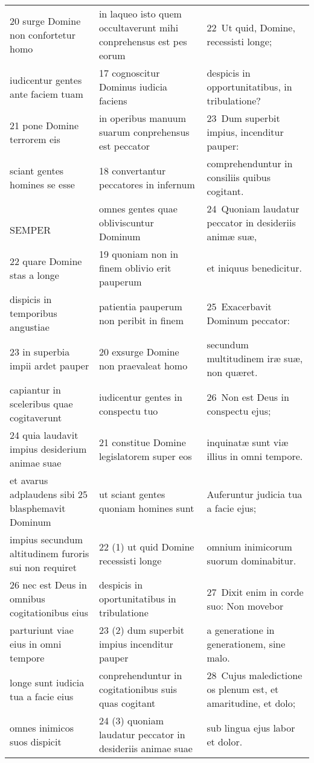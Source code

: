\documentclass{article}
\begin{document}
\begin{longtable}{@{}p{}p{}p{}@{}}
20 surge Domine non confortetur homo	&	in laqueo isto quem occultaverunt mihi conprehensus est pes eorum	&	22 Ut quid, Domine, recessisti longe;	\\
iudicentur gentes ante faciem tuam	&	17 cognoscitur Dominus iudicia faciens	&	despicis in opportunitatibus, in tribulatione?	\\
21 pone Domine terrorem eis	&	in operibus manuum suarum conprehensus est peccator	&	23 Dum superbit impius, incenditur pauper:	\\
sciant gentes homines se esse	&	18 convertantur peccatores in infernum	&	comprehenduntur in consiliis quibus cogitant.	\\
    SEMPER	&	omnes gentes quae obliviscuntur Dominum	&	24 Quoniam laudatur peccator in desideriis animæ suæ,	\\
22 quare Domine stas a longe	&	19 quoniam non in finem oblivio erit pauperum	&	et iniquus benedicitur.	\\
dispicis in temporibus angustiae	&	patientia pauperum non peribit in finem	&	25 Exacerbavit Dominum peccator:	\\
23 in superbia impii ardet pauper	&	20 exsurge Domine non praevaleat homo	&	secundum multitudinem iræ suæ, non quæret.	\\
capiantur in sceleribus quae cogitaverunt	&	iudicentur gentes in conspectu tuo	&	26 Non est Deus in conspectu ejus;	\\
24 quia laudavit impius desiderium animae suae	&	21 constitue Domine legislatorem super eos	&	inquinatæ sunt viæ illius in omni tempore.	\\
et avarus adplaudens sibi 25 blasphemavit Dominum	&	ut sciant gentes quoniam homines sunt	&	Auferuntur judicia tua a facie ejus;	\\
impius secundum altitudinem furoris sui non requiret	&	22 (1) ut quid Domine recessisti longe	&	omnium inimicorum suorum dominabitur.	\\
26 nec est Deus in omnibus cogitationibus eius	&	despicis in oportunitatibus in tribulatione	&	27 Dixit enim in corde suo: Non movebor	\\
parturiunt viae eius in omni tempore	&	23 (2) dum superbit impius incenditur pauper	&	a generatione in generationem, sine malo.	\\
longe sunt iudicia tua a facie eius	&	conprehenduntur in cogitationibus suis quas cogitant	&	28 Cujus maledictione os plenum est, et amaritudine, et dolo;	\\
omnes inimicos suos dispicit	&	24 (3) quoniam laudatur peccator in desideriis animae suae	&	sub lingua ejus labor et dolor.	\\

\end{longtable}
\end{document}
